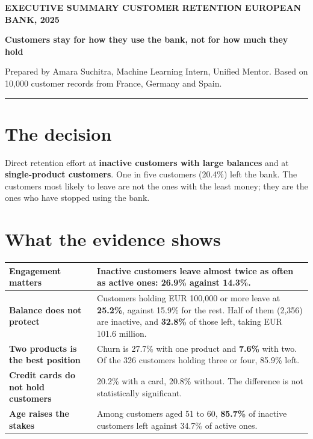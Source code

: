 \documentclass[10pt,a4paper]{article}
\begin{document}
{\color{teal}\footnotesize\bfseries EXECUTIVE SUMMARY \quad\textbar\quad CUSTOMER RETENTION \quad\textbar\quad EUROPEAN BANK, 2025}

\vspace{4pt}
{\LARGE\bfseries\color{navy} Customers stay for how they use the bank, not for how much they hold}

\vspace{2pt}
{\small Prepared by Amara Suchitra, Machine Learning Intern, Unified Mentor. Based on 10,000 customer records from France, Germany and Spain.}

\vspace{4pt}\hrule\vspace{2pt}

\section{The decision}
Direct retention effort at \textbf{inactive customers with large balances} and at \textbf{single-product customers}. One in five customers (20.4\%) left the bank. The customers most likely to leave are not the ones with the least money; they are the ones who have stopped using the bank.

\section{What the evidence shows}
\begin{tabularx}{\textwidth}{@{}>{\bfseries}p{4.6cm}X@{}}
\toprule
Engagement matters & Inactive customers leave almost twice as often as active ones: \textbf{26.9\%} against 14.3\%.\\
\midrule
Balance does not protect & Customers holding EUR 100,000 or more leave at \textbf{25.2\%}, against 15.9\% for the rest. Half of them (2,356) are inactive, and \textbf{32.8\%} of those left, taking EUR 101.6 million.\\
\midrule
Two products is the best position & Churn is 27.7\% with one product and \textbf{7.6\%} with two. Of the 326 customers holding three or four, 85.9\% left.\\
\midrule
Credit cards do not hold customers & 20.2\% with a card, 20.8\% without. The difference is not statistically significant.\\
\midrule
Age raises the stakes & Among customers aged 51 to 60, \textbf{85.7\%} of inactive customers left against 34.7\% of active ones.\\
\bottomrule
\end{tabularx}
\end{document}
